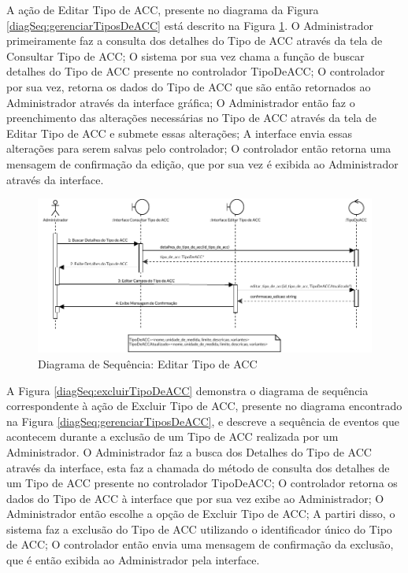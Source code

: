 A ação de Editar Tipo de ACC, presente no diagrama da Figura \ref{diagSeq:gerenciarTiposDeACC} está descrito na Figura \ref{diagSeq:editarTipoDeACC}. O Administrador primeiramente faz a consulta dos detalhes do Tipo de ACC através da tela de Consultar Tipo de ACC; O sistema por sua vez chama a função de buscar detalhes do Tipo de ACC presente no controlador TipoDeACC; O controlador por sua vez, retorna os dados do Tipo de ACC que são então retornados ao Administrador através da interface gráfica; O Administrador então faz o preenchimento das alterações necessárias no Tipo de ACC através da tela de Editar Tipo de ACC e submete essas alterações; A interface envia essas alterações para serem salvas pelo controlador; O controlador então retorna uma mensagem de confirmação da edição, que por sua vez é exibida ao Administrador através da interface.

\begin{figure}[H]
    \centering
    \includegraphics[width=\textwidth]{dados/figuras/Proposta/DiagramasDeSequencia/Gerenciar Tipos de ACC-Atualizar Coordenador.pdf}
    \caption{Diagrama de Sequência: Editar Tipo de ACC}
    \label{diagSeq:editarTipoDeACC}
\end{figure}

A Figura \ref{diagSeq:excluirTipoDeACC} demonstra o diagrama de sequência correspondente à ação de Excluir Tipo de ACC, presente no diagrama encontrado na Figura \ref{diagSeq:gerenciarTiposDeACC}, e descreve a sequência de eventos que acontecem durante a exclusão de um Tipo de ACC realizada por um Administrador. O Administrador faz a busca dos Detalhes do Tipo de ACC através da interface, esta faz a chamada do método de consulta dos detalhes de um Tipo de ACC presente no controlador TipoDeACC; O controlador retorna os dados do Tipo de ACC à interface que por sua vez exibe ao Administrador; O Administrador então escolhe a opção de Excluir Tipo de ACC; A partiri disso, o sistema faz a exclusão do Tipo de ACC utilizando o identificador único do Tipo de ACC; O controlador então envia uma mensagem de confirmação da exclusão, que é então exibida ao Administrador pela interface.

